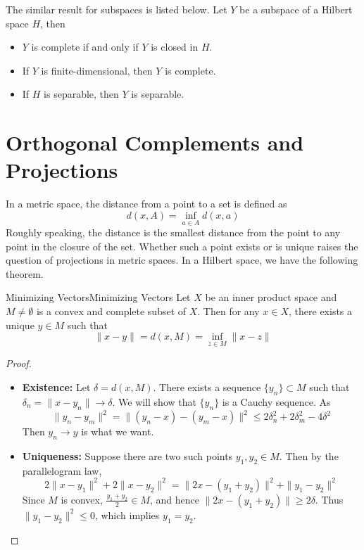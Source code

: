\documentclass[../main.tex]{subfiles}
\begin{document}
The similar result for subspaces is listed below. Let $Y$ be a subspace of a Hilbert space $H$, then
\begin{itemize}
	\item $Y$ is complete if and only if $Y$ is closed in $H$.
	\item If $Y$ is finite-dimensional, then $Y$ is complete.
	\item If $H$ is separable, then $Y$ is separable.
\end{itemize}

\section{Orthogonal Complements and Projections}

In a metric space, the distance from a point to a set is defined as
\begin{equation}
	d(x, A) = \inf_{a \in A} d(x, a)
\end{equation}
Roughly speaking, the distance is the smallest distance from the point to any point in the closure of the set. Whether such a point exists or is unique raises the question of projections in metric spaces. In a Hilbert space, we have the following theorem.

\begin{theorem}{Minimizing Vectors}{Minimizing Vectors}
	Let $X$ be an inner product space and $M\neq \emptyset $ is a convex and complete subset of $X$. Then for any $x\in X$, there exists a unique $y\in M$ such that
	\begin{equation}
		\|x-y\| = d(x,M) = \inf_{z\in M} \|x-z\|
	\end{equation}
\end{theorem}
\begin{proof}
\begin{itemize}
	\item \textbf{Existence:} Let $\delta = d(x,M)$. There exists a sequence $\{y_n\} \subset M$ such that $\delta_n = \|x - y_n\| \to \delta$. We will show that $\{y_n\}$ is a Cauchy sequence. As
		\begin{equation*}
			\|y_n - y_m\|^2 = \|(y_n - x) - (y_m - x)\|^2 \leq 2\delta_n^2 + 2\delta_m^2 - 4 \delta^2
		\end{equation*}
		Then $y_n \rightarrow y$ is what we want.
	\item \textbf{Uniqueness:} Suppose there are two such points $y_1, y_2 \in M$. Then by the parallelogram law,
		\begin{equation*}
			2\|x - y_1\|^2 + 2\|x - y_2\|^2 = \|2x - (y_1 + y_2)\|^2 + \|y_1 - y_2\|^2
		\end{equation*}
		Since $M$ is convex, $\frac{y_1 + y_2}{2} \in M$, and hence $\|2x - (y_1 + y_2)\| \geq 2\delta$. Thus $\|y_1 - y_2\|^2 \leq 0$, which implies $y_1 = y_2$.
\end{itemize}
\end{proof}
\end{document}
